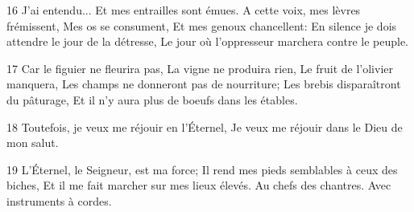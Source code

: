 \par 16 J'ai entendu... Et mes entrailles sont émues. A cette voix, mes lèvres frémissent, Mes os se consument, Et mes genoux chancellent: En silence je dois attendre le jour de la détresse, Le jour où l'oppresseur marchera contre le peuple.
\par 17 Car le figuier ne fleurira pas, La vigne ne produira rien, Le fruit de l'olivier manquera, Les champs ne donneront pas de nourriture; Les brebis disparaîtront du pâturage, Et il n'y aura plus de boeufs dans les étables.
\par 18 Toutefois, je veux me réjouir en l'Éternel, Je veux me réjouir dans le Dieu de mon salut.
\par 19 L'Éternel, le Seigneur, est ma force; Il rend mes pieds semblables à ceux des biches, Et il me fait marcher sur mes lieux élevés. Au chefs des chantres. Avec instruments à cordes.


